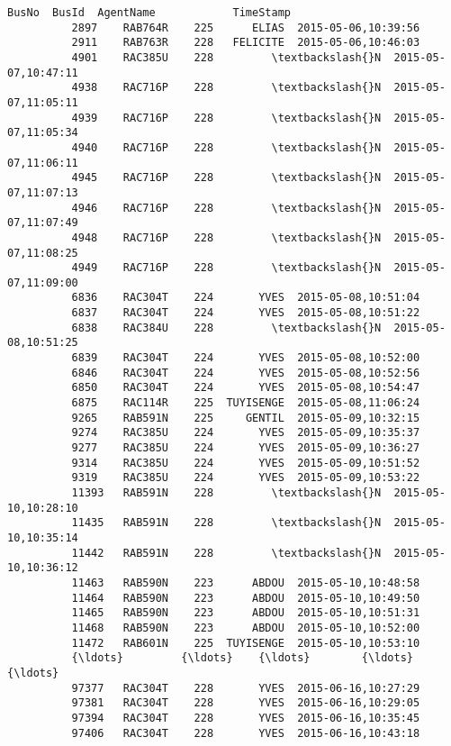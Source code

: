 \documentclass[11pt]{article}
\begin{document}
\begin{Verbatim}[commandchars=\\\{\}]
                    BusNo  BusId  AgentName            TimeStamp  
          2897    RAB764R    225      ELIAS  2015-05-06,10:39:56  
          2911    RAB763R    228   FELICITE  2015-05-06,10:46:03  
          4901    RAC385U    228         \textbackslash{}N  2015-05-07,10:47:11  
          4938    RAC716P    228         \textbackslash{}N  2015-05-07,11:05:11  
          4939    RAC716P    228         \textbackslash{}N  2015-05-07,11:05:34  
          4940    RAC716P    228         \textbackslash{}N  2015-05-07,11:06:11  
          4945    RAC716P    228         \textbackslash{}N  2015-05-07,11:07:13  
          4946    RAC716P    228         \textbackslash{}N  2015-05-07,11:07:49  
          4948    RAC716P    228         \textbackslash{}N  2015-05-07,11:08:25  
          4949    RAC716P    228         \textbackslash{}N  2015-05-07,11:09:00  
          6836    RAC304T    224       YVES  2015-05-08,10:51:04  
          6837    RAC304T    224       YVES  2015-05-08,10:51:22  
          6838    RAC384U    228         \textbackslash{}N  2015-05-08,10:51:25  
          6839    RAC304T    224       YVES  2015-05-08,10:52:00  
          6846    RAC304T    224       YVES  2015-05-08,10:52:56  
          6850    RAC304T    224       YVES  2015-05-08,10:54:47  
          6875    RAC114R    225  TUYISENGE  2015-05-08,11:06:24  
          9265    RAB591N    225     GENTIL  2015-05-09,10:32:15  
          9274    RAC385U    224       YVES  2015-05-09,10:35:37  
          9277    RAC385U    224       YVES  2015-05-09,10:36:27  
          9314    RAC385U    224       YVES  2015-05-09,10:51:52  
          9319    RAC385U    224       YVES  2015-05-09,10:53:22  
          11393   RAB591N    228         \textbackslash{}N  2015-05-10,10:28:10  
          11435   RAB591N    228         \textbackslash{}N  2015-05-10,10:35:14  
          11442   RAB591N    228         \textbackslash{}N  2015-05-10,10:36:12  
          11463   RAB590N    223      ABDOU  2015-05-10,10:48:58  
          11464   RAB590N    223      ABDOU  2015-05-10,10:49:50  
          11465   RAB590N    223      ABDOU  2015-05-10,10:51:31  
          11468   RAB590N    223      ABDOU  2015-05-10,10:52:00  
          11472   RAB601N    225  TUYISENGE  2015-05-10,10:53:10  
          {\ldots}         {\ldots}    {\ldots}        {\ldots}                  {\ldots}  
          97377   RAC304T    228       YVES  2015-06-16,10:27:29  
          97381   RAC304T    228       YVES  2015-06-16,10:29:05  
          97394   RAC304T    228       YVES  2015-06-16,10:35:45  
          97406   RAC304T    228       YVES  2015-06-16,10:43:18  

\end{Verbatim}
\end{document}
